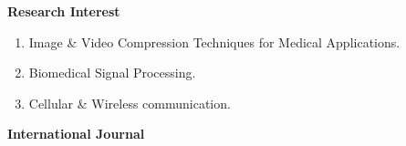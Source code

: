 %
%
%


\textbf{{Research Interest}}
\begin{enumerate}
	\item Image \& Video Compression Techniques for Medical Applications.
	\item Biomedical Signal Processing.
	\item Cellular \& Wireless communication.
\end{enumerate}
	\textbf{{International Journal}}
